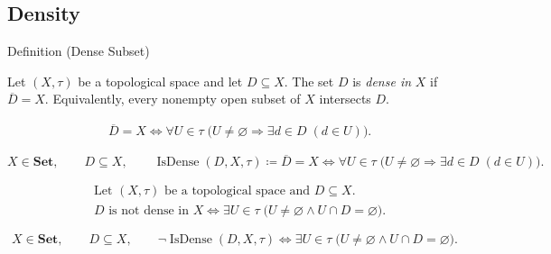 
\subsection*{Density}




\begin{definitionbox}{Definition (Dense Subset)}
\begin{definition}
\label{def:dense-subset}
Let $(X,\tau)$ be a topological space and let $D\subseteq X$.  The set
$D$ is \emph{dense in} $X$ if $\overline{D}=X$.  Equivalently, every
nonempty open subset of $X$ intersects $D$.
\end{definition}
\end{definitionbox}

\begin{remark*}
\[
\begin{aligned}
&\overline{D}=X
\Longleftrightarrow
\forall U\in\tau\;
\bigl(U\neq\varnothing\Longrightarrow \exists d\in D\;(d\in U)\bigr).
\end{aligned}
\]
\end{remark*}

\begin{remark*}
\[
X\in\mathbf{Set},\qquad D\subseteq X,\qquad
\operatorname{IsDense}(D,X,\tau)\coloneqq
\overline{D}=X
\Longleftrightarrow
\forall U\in\tau\;
\bigl(U\neq\varnothing\Longrightarrow \exists d\in D\;(d\in U)\bigr).
\]
\end{remark*}

\begin{remark*}
\[
\begin{aligned}
&\text{Let }(X,\tau)\text{ be a topological space and }D\subseteq X.\\
&D\text{ is not dense in }X
\Longleftrightarrow
\exists U\in\tau\;\bigl(U\neq\varnothing\land U\cap D=\varnothing\bigr).
\end{aligned}
\]
\end{remark*}

\begin{remark*}
\[
X\in\mathbf{Set},\qquad D\subseteq X,\qquad
\neg\operatorname{IsDense}(D,X,\tau)\Longleftrightarrow
\exists U\in\tau\;\bigl(U\neq\varnothing\land U\cap D=\varnothing\bigr).
\]
\end{remark*}

